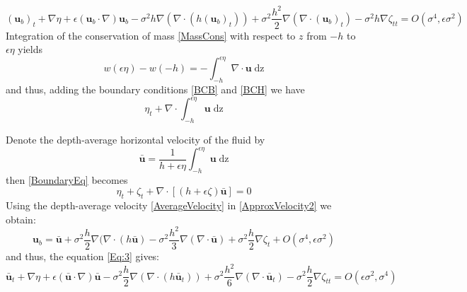 \documentclass[11pt,a4paper]{article}
\begin{document}
			\begin{equation}
				(\mathbf{u}_b)_t + \nabla \eta + \epsilon (\mathbf{u}_b \cdot \nabla)\mathbf{u}_b - \sigma^2 h \nabla (\nabla \cdot (h (\mathbf{u}_b)_t)) + \sigma^2 \frac{h^2}{2} \nabla (\nabla \cdot (\mathbf{u}_b)_t) - \sigma^2 h \nabla \zeta_{tt} = O(\sigma^4, \epsilon \sigma ^2) \label{Eq:3}
			\end{equation}
			Integration of the conservation of mass \eqref{MassCons} with respect to $z$ from $-h$ to $\epsilon\eta$ yields
			\begin{equation}
				w(\epsilon\eta) - w(-h) = - \int^{\epsilon\eta}_{-h} \! \nabla \cdot \mathbf{u} \; \mathrm{dz}
			\end{equation}
			and thus, adding the boundary conditions \eqref{BCB} and \eqref{BCH} we have
			\begin{equation}
				\eta_t + \nabla \cdot \int^{\epsilon\eta}_{-h}\ \mathbf{u} \; \mathrm{dz} 
				\label{BoundaryEq}
			\end{equation}
			
			Denote the depth-average horizontal velocity of the fluid by 
			\begin{equation}
				\bar{\mathbf{u}} = \frac{1}{h+\epsilon \eta} \int^{\epsilon\eta}_{-h}\! \mathbf{u} \; \mathrm{dz} \label{AverageVelocity}
			\end{equation}
			then \eqref{BoundaryEq} becomes 
			\begin{equation}
				\eta_t + \zeta_t + \nabla \cdot [(h + \epsilon \zeta) \bar{\mathbf{u}}] = 0 
				\label{Eq:Sys2}
			\end{equation}
			Using the depth-average velocity \eqref{AverageVelocity} in
			\eqref{ApproxVelocity2} we obtain: 
			\begin{equation}
				\mathbf{u}_b = \bar{\mathbf{u}} + \sigma^2\frac{h}{2} \nabla (\nabla \cdot (h \bar{\mathbf{u}}) - \sigma^2 \frac{h^2}{3} \nabla (\nabla \cdot \bar{\mathbf{u}}) + \sigma^2 \frac{h}{2} \nabla \zeta_t + O(\sigma^4, \epsilon \sigma^2) 
			\end{equation}
			and thus, the equation \eqref{Eq:3} gives: 
			\begin{equation}
				\bar{\mathbf{u}}_t + \nabla \eta + \epsilon(\bar{\mathbf{u}} \cdot \nabla) \bar{\mathbf{u}} - \sigma^2 \frac{h}{2} \nabla ( \nabla \cdot (h\bar{\mathbf{u}}_t)) + \sigma^2 \frac{h^2}{6}\nabla ( \nabla \cdot \bar{\mathbf{u}}_t) - \sigma^2\frac{h}{2}\nabla \zeta_{tt} = O(\epsilon \sigma^2, \sigma^4) \label{Eq:Sys1}
			\end{equation}
			
\end{document}
